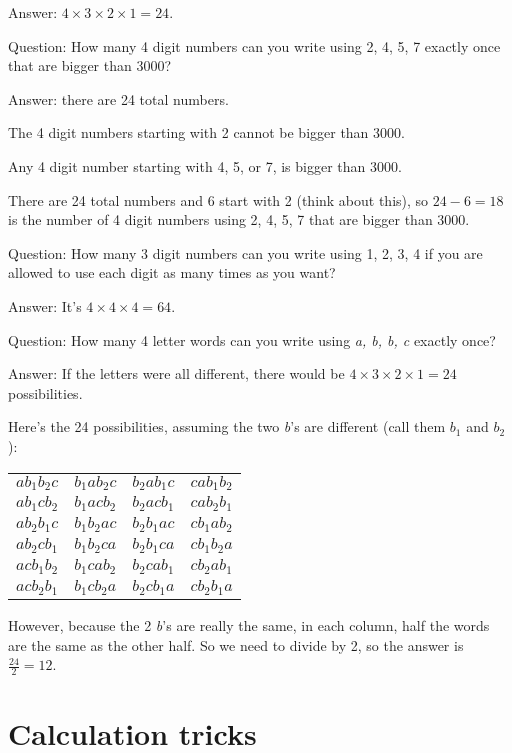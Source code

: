 \documentclass[fullpage,twocolumn]{article}
\newcommand{\vp}{{\vspace{0.1in}}}
\begin{document}
\vp
Answer: $4 \times 3 \times 2 \times 1 = 24$.

Question: How many 4 digit numbers can you write using 2, 4, 5, 7 exactly once that are bigger than 3000?

\vp
Answer: there are 24 total numbers.

The 4 digit numbers starting with 2 cannot be bigger than 3000.

Any 4 digit number starting with 4, 5, or 7, is bigger than 3000.

There are 24 total numbers and 6 start with 2 (think about this), so $24-6=18$ is
the number of 4 digit numbers using 2, 4, 5, 7 that are bigger than 3000.

Question: How many 3 digit numbers can you write using 1, 2, 3, 4 if you are
allowed to use each digit as many times as you want?

\vp
Answer: It's $4 \times 4 \times 4 = 64$.

Question: How many 4 letter words can you write using {\em a, b, b, c} exactly once?

\vp
Answer: If the letters were all different, there would be $4 \times 3 \times 2
\times 1 = 24$ possibilities.

Here's the 24 possibilities, assuming the two {\em b}'s are different (call
them $b_1$ and $b_2$):

\begin{tabular}{llll}
$a b_1 b_2 c $  & $ b_1 a b_2 c $ & $b_2 a b_1 c  $ & $c a b_1 b_2 $  \\
$a b_1 c b_2 $  & $ b_1 a c b_2 $ & $b_2 a c b_1  $ & $c a b_2 b_1 $  \\
$a b_2 b_1 c $  & $ b_1 b_2 a c $ & $b_2 b_1 a c  $ & $c b_1 a b_2 $  \\
$a b_2 c b_1 $  & $ b_1 b_2 c a $ & $b_2 b_1 c a  $ & $c b_1 b_2 a $  \\
$a c b_1 b_2 $  & $ b_1 c a b_2 $ & $b_2 c a b_1  $ & $c b_2 a b_1 $  \\
$a c b_2 b_1 $  & $ b_1 c b_2 a $ & $b_2 c b_1 a  $ & $c b_2 b_1 a $  \\
\end{tabular}

However, because the 2 {\em b}'s are really the same, in each
column, half the words are the same as the other half. So we need
to divide by 2, so the answer is $\frac{24}{2} = 12$.

\section{Calculation tricks}
\end{document}
